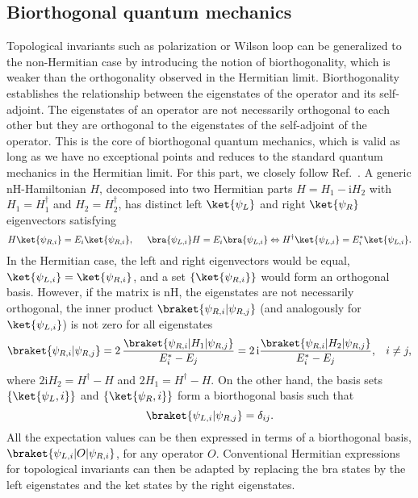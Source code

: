 \subsection{Biorthogonal quantum mechanics}
Topological invariants such as polarization or Wilson loop can be generalized to the non-Hermitian case by introducing the notion of biorthogonality, which is weaker than the orthogonality observed in the Hermitian limit. Biorthogonality establishes the relationship between the eigenstates of the operator and its self-adjoint. The eigenstates of an operator are not necessarily orthogonal to each other but they are orthogonal to the eigenstates of the self-adjoint of the operator. This is the core of biorthogonal quantum mechanics, which is valid as long as we have no exceptional points and reduces to the standard quantum mechanics in the Hermitian limit. For this part, we closely follow Ref.~\cite{brody2013biorthogonal}. 
A generic nH-Hamiltonian $H$, decomposed into two Hermitian parts $H = H_1  - \mathrm{i} H_2$ with $H_1 = H_1^{\dagger}$ and $H_2= H_2^{\dagger}$, has distinct left $\ket{\psi_L}$ and right $\ket{\psi_R}$ eigenvectors satisfying
\begin{equation}
H  \ket{\psi_{R, i}} = E_i \ket{\psi_{R, i}}, \hspace*{0.5cm} \bra{\psi_{L, i}} H = E_i  \bra{\psi_{L, i}}               \Leftrightarrow H^{\dagger} \ket{\psi_{L, i}} = E_i^*  \ket{\psi_{L, i}}.
\label{eq:schrod-eq}
\end{equation}
In the Hermitian case, the left and right eigenvectors would be equal, $\ket{\psi_{L, i}} = \ket{\psi_{R, i}}$, and a set $\lbrace \ket{\psi_{R, i}} \rbrace$ would form an orthogonal basis. However, if the matrix is nH, the eigenstates are not necessarily orthogonal, \ie the inner product $\braket{ \psi_{R, i} | \psi_{R, j}}$ (and analogously for $\ket{\psi_{L, i}}$) is not zero for all eigenstates
\begin{equation}
\braket{ \psi_{R, i} | \psi_{R, j}} = 2 \,  \frac{ \braket{\psi_{R, i} | H_1 | \psi_{R, j}}} {E^*_i - E_j}  = 2 \,  \mathrm{i} \frac{ \braket{\psi_{R, i} | H_2 | \psi_{R, j}}}{E^*_i - E_j} ,  \hspace*{0.3cm} i \neq j,
\label{eq:biorth_norm}
\end{equation}
where $2 \mathrm{i} H_2 = H^{\dagger} - H$ and $2 H_1 = H^{\dagger} - H$. On the other hand, the basis sets $\lbrace \ket{\psi_L, i} \rbrace$ and $\lbrace \ket{\psi_R, i} \rbrace$ form a biorthogonal basis such that
\begin{equation}
\braket{\psi_{L,i } | \psi_{R,j}} = \delta_{ij}. 
\label{eq:biorth_norm_LR}
\end{equation} 
All the expectation values can be then expressed in terms of a biorthogonal basis, $\braket{\psi_{L, i} | O | \psi_{R,i}}$, for any operator $O$. Conventional Hermitian expressions for topological invariants can then be adapted by replacing the bra states by the left eigenstates and the ket states by the right eigenstates.


